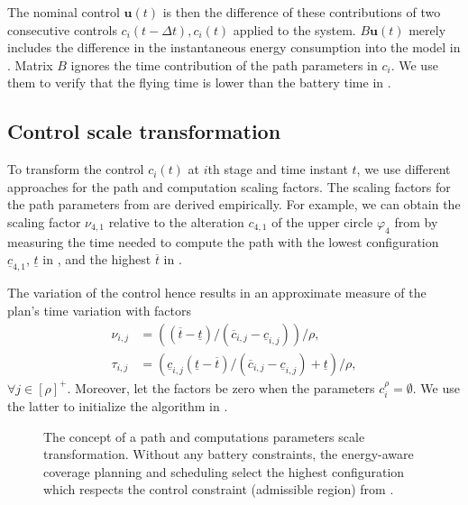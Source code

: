 The nominal control $\mathbf{u}(t)$ is then the difference of these contributions of two consecutive controls $c_i(t-\Delta t),c_i(t)$ applied to the system. 
$B\mathbf{u}(t)$ merely includes the difference in the instantaneous energy consumption into the model in . Matrix $B$ ignores the time contribution of the path parameters in $c_i$. We use them to verify that the flying time is lower than the battery time in .

\subsection{Control scale transformation}
\label{sec:merging}

To transform the control $c_i(t)$ at $i$th stage and time instant $t$, we use different approaches for the path and computation scaling factors.
The scaling factors for the path parameters from  are derived empirically. For example, we can obtain the scaling factor $\nu_{4,1}$ relative to the alteration $c_{4,1}$ of the upper circle $\varphi_4$ from  by measuring the time needed to compute the path with the lowest configuration $\underline{c}_{4,1}$, $\underline{t}$ in , and the highest $\overline{t}$ in . 

The variation of the control hence results in an approximate measure of the plan's time variation with factors
\begin{subequations}\label{eq:scale-traj}\begin{align}
  \nu_{i,j}&=\left((\overline{t}-\underline{t})/(\overline{c}_{i,j}-\underline{c}_{i,j})\right)/\rho,\\
  \tau_{i,j}&=\left(\underline{c}_{i,j}(\underline{t}-\overline{t})/(\overline{c}_{i,j}-\underline{c}_{i,j})+\underline{t}\right)/\rho,
\end{align}\end{subequations} 
$\forall j\in[\rho]^+$. Moreover, let the factors be zero when the parameters $c_i^\rho=\emptyset$. We use the latter to initialize the algorithm in .

\begin{figure}[h!]
  \centering
  \selectfont
  
  \caption[Concept of a path and computations parameters scale transformation]{The concept of a path and computations parameters scale transformation. Without any battery constraints, the energy-aware coverage planning and scheduling select the highest configuration which respects the control constraint (admissible region) from .}
  \label{fig:plot-6}
\end{figure}

